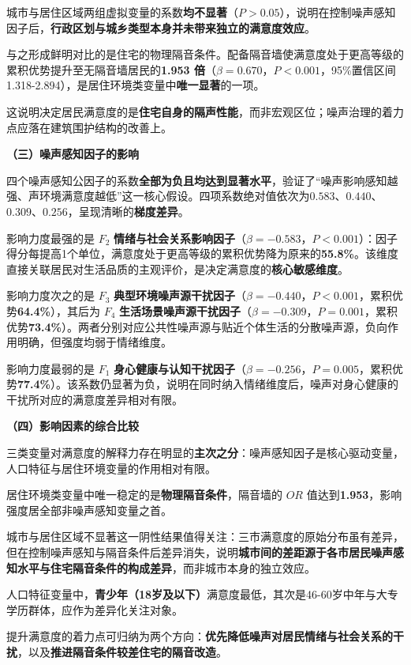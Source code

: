 城市与居住区域两组虚拟变量的系数\textbf{均不显著}（$P>0.05$），说明在控制噪声感知因子后，\textbf{行政区划与城乡类型本身并未带来独立的满意度效应}。

与之形成鲜明对比的是住宅的物理隔音条件。配备隔音墙使满意度处于更高等级的累积优势提升至无隔音墙居民的\textbf{1.953 倍}（$\beta=0.670$，$P<0.001$，95\%置信区间1.318-2.894），是居住环境类变量中\textbf{唯一显著}的一项。

这说明决定居民满意度的是\textbf{住宅自身的隔声性能}，而非宏观区位；噪声治理的着力点应落在建筑围护结构的改善上。

\textbf{（三）噪声感知因子的影响}

四个噪声感知公因子的系数\textbf{全部为负且均达到显著水平}，验证了“噪声影响感知越强、声环境满意度越低”这一核心假设。四项系数绝对值依次为$0.583$、$0.440$、$0.309$、$0.256$，呈现清晰的\textbf{梯度差异}。

影响力度最强的是 $F_2$ \textbf{情绪与社会关系影响因子}（$\beta=-0.583$，$P<0.001$）：因子得分每提高1个单位，满意度处于更高等级的累积优势降为原来的\textbf{55.8\%}。该维度直接关联居民对生活品质的主观评价，是决定满意度的\textbf{核心敏感维度}。

影响力度次之的是 $F_3$ \textbf{典型环境噪声源干扰因子}（$\beta=-0.440$，$P<0.001$，累积优势\textbf{64.4\%}），其后为 $F_4$ \textbf{生活场景噪声源干扰因子}（$\beta=-0.309$，$P=0.001$，累积优势\textbf{73.4\%}）。两者分别对应公共性噪声源与贴近个体生活的分散噪声源，负向作用明确，但强度均弱于情绪维度。

影响力度最弱的是 $F_1$ \textbf{身心健康与认知干扰因子}（$\beta=-0.256$，$P=0.005$，累积优势\textbf{77.4\%}）。该系数仍显著为负，说明在同时纳入情绪维度后，噪声对身心健康的干扰所对应的满意度差异相对有限。

\textbf{（四）影响因素的综合比较}

三类变量对满意度的解释力存在明显的\textbf{主次之分}：噪声感知因子是核心驱动变量，人口特征与居住环境变量的作用相对有限。

居住环境类变量中唯一稳定的是\textbf{物理隔音条件}，隔音墙的 $OR$ 值达到\textbf{1.953}，影响强度居全部非噪声感知变量之首。

城市与居住区域不显著这一阴性结果值得关注：三市满意度的原始分布虽有差异，但在控制噪声感知与隔音条件后差异消失，说明\textbf{城市间的差距源于各市居民噪声感知水平与住宅隔音条件的构成差异}，而非城市本身的独立效应。

人口特征变量中，\textbf{青少年（18岁及以下）}满意度最低，其次是46-60岁中年与大专学历群体，应作为差异化关注对象。

提升满意度的着力点可归纳为两个方向：\textbf{优先降低噪声对居民情绪与社会关系的干扰}，以及\textbf{推进隔音条件较差住宅的隔音改造}。

